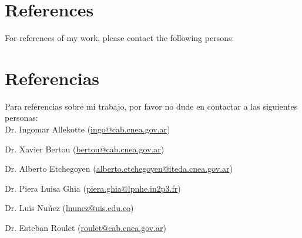 \ifeng
\section*{References}

For references of my work, please contact the following persons:\\
\else
\section*{Referencias}

Para referencias sobre mi trabajo, por favor no dude en contactar a las siguientes personas:\\

\fi
Dr. Ingomar Allekotte (\href{mailto:ingo@cab.cnea.gov.ar}{ingo@cab.cnea.gov.ar})

Dr. Xavier Bertou (\href{mailto:bertou@cab.cnea.gov.ar}{bertou@cab.cnea.gov.ar})

Dr. Alberto Etchegoyen (\href{mailto:alberto.etchegoyen@iteda.cnea.gov.ar}{alberto.etchegoyen@iteda.cnea.gov.ar})

Dr. Piera Luisa Ghia (\href{mailto:piera.ghia@lpnhe.in2p3.fr}{piera.ghia@lpnhe.in2p3.fr})


Dr. Luis Nuñez (\href{mailto:lnunez@uis.edu.co}{lnunez@uis.edu.co})

Dr. Esteban Roulet (\href{mailto:roulet@cab.cnea.gov.ar}{roulet@cab.cnea.gov.ar})
